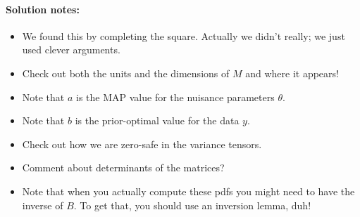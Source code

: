 \documentclass[12pt, letterpaper]{article}
\begin{document}
\paragraph{Solution notes:}
\begin{itemize}
\item
We found this by completing the square. Actually we didn't really; we just
used clever arguments.
\item
Check out both the units and the dimensions of $M$ and where it appears!
\item
Note that $a$ is the MAP value for the nuisance parameters $\theta$.
\item
Note that $b$ is the prior-optimal value for the data $y$.
\item
Check out how we are zero-safe in the variance tensors.
\item
Comment about determinants of the matrices?
\item
Note that when you actually compute these pdfs you might need to have the
inverse of $B$. To get that, you should use an inversion lemma, duh!
\end{itemize}
\end{document}
